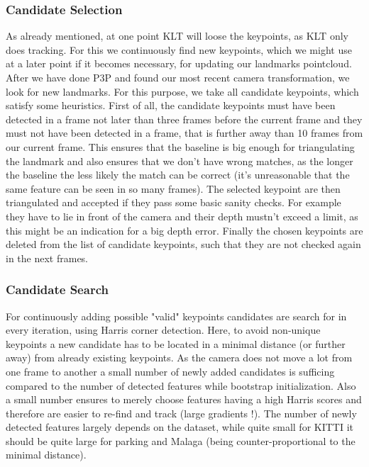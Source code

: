 \documentclass[letterpaper, 12 pt]{article}
\begin{document}
\begin{multicols*}{2}
\subsubsection{Candidate Selection}
As already mentioned, at one point KLT will loose the keypoints, as KLT only does tracking. For this we continuously find new keypoints, which we might use at a later point if it becomes necessary, for updating our landmarks pointcloud. After we have done P3P and found our most recent camera transformation, we look for new landmarks. For this purpose, we take all candidate keypoints, which satisfy some heuristics. First of all, the candidate keypoints must have been detected in a frame not later than three frames before the current frame and they must not have been detected in a frame, that is further away than 10 frames from our current frame. This ensures that the baseline is big enough for triangulating the landmark and also ensures that we don't have wrong matches, as the longer the baseline the less likely the match can be correct (it's unreasonable that the same feature can be seen in so many frames). The selected keypoint are then triangulated and accepted if they pass some basic sanity checks. For example they have to lie in front of the camera and their depth mustn't exceed a limit, as this might be an indication for a big depth error. Finally the chosen keypoints are deleted from the list of candidate keypoints, such that they are not checked again in the next frames.

\subsubsection{Candidate Search}
For continuously adding possible "valid" keypoints candidates are search for in every iteration, using Harris corner detection. Here, to avoid non-unique keypoints a new candidate has to be located in a minimal distance (or further away) from already existing keypoints. As the camera does not move a lot from one frame to another a small number of newly added candidates is sufficing compared to the number of detected features while bootstrap initialization. Also a small number ensures to merely choose features having a high Harris scores and therefore are easier to re-find and track (large gradients !). The number of newly detected features largely depends on the dataset, while quite small for KITTI it should be quite large for parking and Malaga (being counter-proportional to the minimal distance). 


\end{multicols*}
\end{document}
